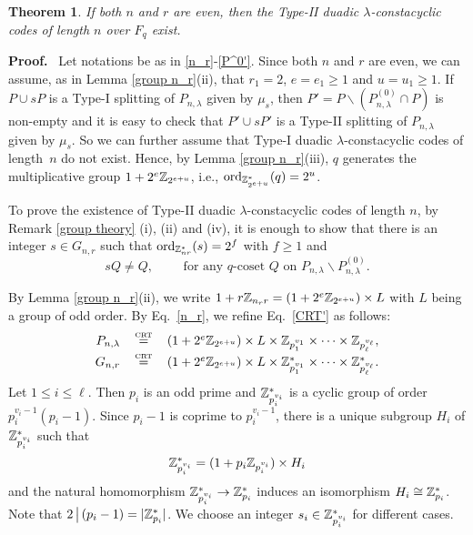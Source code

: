\documentclass{article}
\newtheorem{Theorem}{Theorem}[section]
\numberwithin{equation}{section}
\numberwithin{table}{section}
\def\Z{{\Bbb Z}}
\def\pf{\par{\bf Proof.}~ }
\def\CRT{\,\mathop{=}\limits^{\mbox{\rm\tiny CRT}}\,}
\begin{document}
\begin{Theorem}\label{r even} If both $n$ and $r$ are even, then the
Type-II duadic $\lambda$-constacyclic codes of length $n$ over $F_q$ exist.
\end{Theorem}

\pf Let notations be as in \eqref{n_r}-\eqref{P^0'}.
Since both $n$ and $r$ are even,
we can assume, as in Lemma \ref{group n_r}(ii),
that $r_1=2$, $e=e_1\ge 1$ and $u=u_1\ge 1$.
If $P\cup sP$ is a Type-I splitting of $P_{n,\lambda}$ given by $\mu_s$,
then $P'=P\backslash(P_{n,\lambda}^{(0)}\cap P)$ is non-empty and 
it is easy to check that $P'\cup sP'$ is a 
Type-II splitting of $P_{n,\lambda}$ given by $\mu_s$.
So we can further assume that
Type-I duadic $\lambda$-constacyclic codes of length~$n$ do not exist.
Hence, by Lemma \ref{group n_r}(iii),
$q$ generates the multiplicative group $1+2^e\Z_{2^{e+u}}$, i.e.,
${\rm ord}_{\Z_{2^{e+u}}^*}(q)=2^u$.

To prove the existence of Type-II duadic $\lambda$-constacyclic codes of length $n$,
by Remark \ref{group theory} (i), (ii) and (iv),
it is enough to show that there is an integer $s\in G_{n,r}$
such that ${\rm ord}_{\Z_{nr}^*}(s)=2^f$ with $f\ge 1$ and
\begin{equation}\label{sQ neq Q}
sQ\ne Q,\qquad\mbox{ for any $q$-coset $Q$ on~}
 P_{n,\lambda}\backslash P_{n,\lambda}^{(0)}.
\end{equation}

By Lemma \ref{group n_r}(ii), we write
$1+r\Z_{n_r r}=(1+2^e\Z_{2^{e+u}})\times L$ with $L$ being a group of odd order.
By Eq.~\eqref{n_r},  we refine Eq.~\eqref{CRT'} as follows:
\begin{equation*}
\begin{array}{rcl}
P_{n,\lambda}&\CRT & (1+2^e\Z_{2^{e+u}})\times L\times
  \Z_{p_1^{v_1}}\times\cdots\times\Z_{p_\ell^{v_\ell}},\\[3pt]
G_{n,r}  &\CRT& (1+2^e\Z_{2^{e+u}})\times L
 \times \Z_{p_1^{v_1}}^*\times\cdots\times\Z_{p_\ell^{v_\ell}}^*.
\end{array}
\end{equation*}
Let $1\le i\le \ell$. Then $p_i$ is an odd prime and
$\Z_{p_i^{v_i}}^*$ is a cyclic group of order $p_i^{v_i-1}(p_i-1)$.
Since $p_i-1$ is coprime to $p_i^{v_i-1}$,
there is a unique subgroup $H_i$ of $\Z_{p_i^{v_i}}^*$ such that
\begin{equation}\label{H_i}
\Z_{p_i^{v_i}}^*=(1+p_i\Z_{p_i^{v_i}})\times H_i
\end{equation}
and the natural homomorphism $\Z_{p_i^{v_i}}^*\to\Z_{p_i}^*$ induces
an isomorphism $H_i\cong\Z_{p_i}^*$.
Note that $2\,\big|\,(p_i-1)=|\Z_{p_i}^*|$.
We choose an integer $s_i\in\Z_{p_i^{v_i}}^*$ for different cases.
\end{document}
